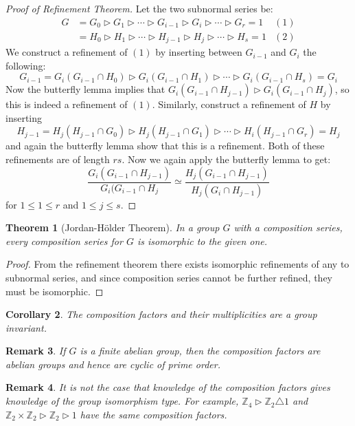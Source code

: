 \documentclass[a4paper,10pt]{article}
\newcommand{\ZZ}{\mathbb{Z}}
\newtheorem{thm}{Theorem}
\newtheorem{Cor}[thm]{Corollary}
\newtheorem{rem}[thm]{Remark}
\begin{document}
\begin{proof}[Proof of Refinement Theorem]
Let the two subnormal series be:
\begin{align*}
G &= G_0 \triangleright G_1 \triangleright \cdots \triangleright G_{i-1} \triangleright G_i \triangleright \cdots \triangleright G_r = 1 &(1)\\
  &= H_0 \triangleright H_1 \triangleright \cdots \triangleright H_{j-1} \triangleright H_j \triangleright \cdots \triangleright H_s = 1 &(2)
\end{align*}
We construct a refinement of $(1)$ by inserting between $G_{i-1}$ and $G_{i}$ the following:
\[ G_{i-1} = G_i (G_{i-1} \cap H_0) \triangleright G_i(G_{i-1} \cap H_1) \triangleright \cdots \triangleright G_i (G_{i-1} \cap H_s) = G_i \]
Now the butterfly lemma implies that $G_i(G_{i-1} \cap H_{j-1} )\triangleright G_i(G_{i-1} \cap H_j)$, so this is indeed a refinement of $(1)$. Similarly, construct a refinement of $H$ by inserting 
\[ H_{j-1} = H_j (H_{j-1} \cap G_0) \triangleright H_j(H_{j-1} \cap G_1) \triangleright \cdots \triangleright H_i (H_{j-1} \cap G_r) = H_j \]
and again the butterfly lemma show that this is a refinement. Both of these refinements are of length $rs$. Now we again apply the butterfly lemma to get:
\[ \frac{G_i(G_{i-1} \cap H_{j-1})}{G_i(G_{i-1} \cap H_j} \simeq \frac{H_j (G_{i-1} \cap H_{j-1})}{H_j(G_i \cap H_{j-1})} \]
for $1 \leq 1 \leq r$ and $1 \leq j \leq s$.
\end{proof}

\begin{thm}[Jordan-H\"{o}lder Theorem]
In a group $G$ with a composition series, every composition series for $G$ is isomorphic to the given one.
\end{thm}
\begin{proof}
From the refinement theorem there exists isomorphic refinements of any to subnormal series, and since composition series cannot be further refined, they must be isomorphic.
\end{proof}

\begin{Cor}
The composition factors and their multiplicities are a group invariant. 
\end{Cor}

\begin{rem}
If $G$ is a finite abelian group, then the composition factors are abelian groups and hence are cyclic of prime order.
\end{rem}

\begin{rem}
It is not the case that knowledge of the composition factors gives knowledge of the group isomorphism type. For example, $\ZZ_4 \triangleright \ZZ_2 \triangle 1$ and $\ZZ_2 \times \ZZ_2 \triangleright \ZZ_2 \triangleright 1$ have the same composition factors.
\end{rem}
\end{document}
